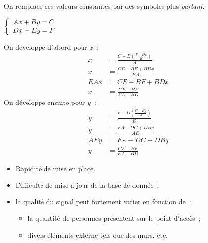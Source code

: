 \documentclass[11pt,a4paper]{article}
\begin{document}
      On remplace ces valeurs constantes par des symboles plus \textit{parlant}.
      \begin{center}
        $\left \{
        \begin{array}{c c}
          Ax+By = C \\
          Dx+Ey = F
        \end{array}
        \right.$
      \end{center}
      On développe d'abord pour $x$~:
      \begin{align*}
        x &= \frac{C-B(\frac{F-Dx}{E})}{A} \\
        x &= \frac{CE-BF+BDx}{EA} \\
        EAx &= CE-BF+BDx \\
        x &= \frac{CE-BF}{EA-BD}
      \end{align*}
      On développe ensuite pour $y$~:
      \begin{align*}
        y &= \frac{F-D(\frac{C-By}{A})}{E} \\
        y &= \frac{FA-DC+DBy}{AE} \\
        AEy &= FA-DC+DBy \\
        y &= \frac{CE-BF}{EA-BD}
      \end{align*}

    \begin{tcolorbox}[title=Avantages :]
      \begin{itemize}
        \item Rapidité de mise en place.
      \end{itemize}
    \end{tcolorbox}
    \begin{tcolorbox}[title=Désavantages :]
      \begin{itemize}
        \item Difficulté de mise à jour de la base de donnée~;
        \item la qualité du signal peut fortement varier en fonction de~:
          \begin{itemize}
            \item la quantité de personnes présentent sur le point d'accès~;
            \item divers éléments externe tels que des murs, etc.
	      \end{itemize}
      \end{itemize}
    \end{tcolorbox}
\end{document}
